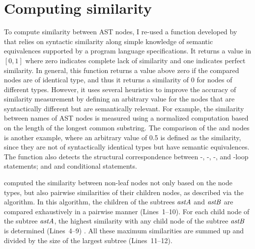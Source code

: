 \section{Computing similarity}  \label{jigsaw-similarity}
To compute similarity between AST nodes, I re-used a function developed by \citet{2008:fse:cottrell} that relies on syntactic similarity along simple knowledge of semantic equivalences supported by a program language specifications. It returns a value in $[0, 1]$ where zero indicates complete lack of similarity and one indicates perfect similarity. In general, this function returns a value above zero if the compared nodes are of identical type, and thus it returns a similarity of 0 for nodes of different types. 
However, it uses several heuristics to improve the accuracy of similarity measurement by defining an arbitrary value for the nodes that are syntactically different but are semantically relevant. For example, the similarity between names of AST nodes is measured using a normalized computation based on the length of the longest common substring. The comparison of the  and  nodes is another example, where an arbitrary value of 0.5 is defined as the similarity, since they are not of syntactically identical types but have semantic equivalences. The function also detects the structural correspondence between -, -, -, and -loop statements; and  and  conditional statements.

\citet{2008:fse:cottrell} computed the similarity between non-leaf nodes not only based on the node types, but also pairwise similarities of their children nodes, as described via the  algorithm. In this algorithm, the children of the subtrees $\mathit{astA}$ and $\mathit{astB}$ are compared exhaustively in a pairwise manner (Lines~1--10). For each child node of the subtree $\mathit{astA}$, the highest similarity with any child node of the subtree $\mathit{astB}$ is determined (Lines~4--9) . All these maximum similarities are summed up and divided by the size of the largest subtree (Lines~11--12).

